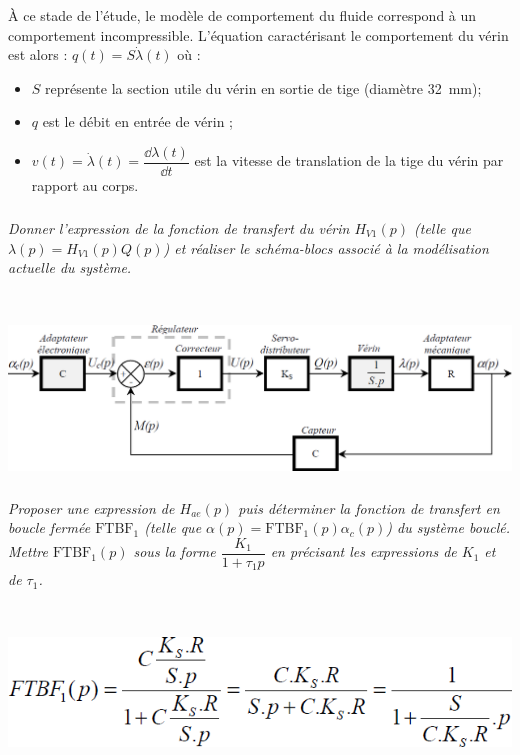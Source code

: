 \begin{multicols}{2}
\begin{multicols}{2}
À ce stade de l'étude, le modèle de comportement du fluide correspond à un comportement incompressible. L'équation caractérisant le comportement du vérin est alors : $q(t)=S\dot{\lambda}(t)$ où :
\begin{itemize}
\item $S$ représente la section utile du vérin en sortie de tige (diamètre \SI{32}{mm});
\item $q$ est le débit en entrée de vérin ;
\item $v(t)=\dot{\lambda}(t)=\dfrac{\dd \lambda(t) }{\dd t}$ est la vitesse de translation de la tige du vérin par rapport au corps.
\end{itemize}
% 

\subparagraph{}\textit{Donner l'expression de la fonction de transfert du vérin $H_{V1}(p)$ (telle que $\lambda(p) = H_{V1}(p) Q(p)$) et réaliser le schéma-blocs associé à la modélisation actuelle du système.}
\ifprof
\begin{corrige} ~\\

\begin{center}
\includegraphics[width=.95\linewidth]{images/cor_01}
\end{center}
\end{corrige}
\else
\fi

\subparagraph{}\textit{Proposer une expression de $H_{ae}(p)$ puis déterminer la fonction de transfert en boucle fermée $\text{FTBF}_1$ (telle que $\alpha(p) = \text{FTBF}_1(p) \alpha_c(p)$) du système bouclé. Mettre  $\text{FTBF}_1(p)$ sous la forme $\dfrac{K_1}{1+\tau_1 p}$ en précisant les expressions de $K_1$ et de $\tau_1$.} 
 \ifprof
\begin{corrige} ~\\

\begin{center}
\includegraphics[width=.95\linewidth]{images/cor_02}
\end{center}
\end{corrige}
\else
\fi



\end{multicols}
\end{multicols}
